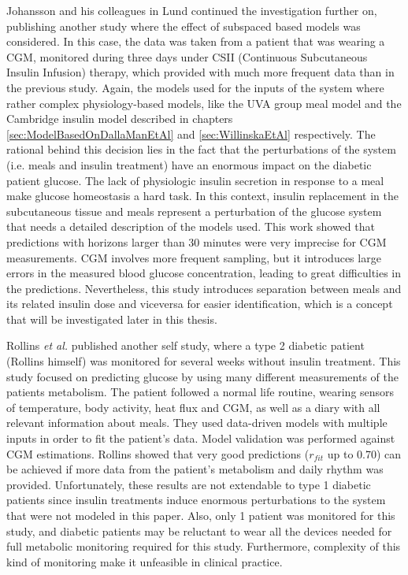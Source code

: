 Johansson and his colleagues in Lund continued the investigation further on, publishing another study \cite{cescon2009subspace} where the effect of subspaced based models was considered. In this case, the data was taken from a patient that was wearing a CGM, monitored during three days under CSII (Continuous Subcutaneous Insulin Infusion) therapy, which provided with much more frequent data than in the previous study. Again, the models used for the inputs of the system where rather complex physiology-based models, like the UVA group meal model and the Cambridge insulin model described in chapters \ref{sec:ModelBasedOnDallaManEtAl} and \ref{sec:WillinskaEtAl} respectively. The rational behind this decision lies in the fact that the perturbations of the system (i.e. meals and insulin treatment) have an enormous impact on the diabetic patient glucose. The lack of physiologic insulin secretion in response to a meal make glucose homeostasis a hard task. In this context, insulin replacement in the subcutaneous tissue and meals represent a perturbation of the glucose system that needs a detailed description of the models used. This work showed that predictions with horizons larger than 30 minutes were very imprecise for CGM measurements. CGM involves more frequent sampling, but it introduces large errors in the measured blood glucose concentration, leading to great difficulties in the predictions. Nevertheless, this study introduces separation between meals and its related insulin dose and viceversa for easier identification, which is a concept that will be investigated later in this thesis.

Rollins \textit{et al.} published another self study, where a type 2 diabetic patient (Rollins himself) was monitored for several weeks \cite{rollins2010free} without insulin treatment. This study focused on predicting glucose by using many different measurements of the patients metabolism. The patient followed a normal life routine, wearing sensors of temperature, body activity, heat flux and CGM, as well as a diary with all relevant information about meals. They used data-driven models with multiple inputs in order to fit the patient's data. Model validation was performed against CGM estimations.
Rollins showed that very good predictions ($r_{fit}$ up to 0.70) can be achieved if more data from the patient's metabolism and daily rhythm was provided. Unfortunately, these results are not extendable to type 1 diabetic patients since insulin treatments induce enormous perturbations to the system that were not modeled in this paper. Also, only 1 patient was monitored for this study, and diabetic patients may be reluctant to wear all the devices needed for full metabolic monitoring required for this study. Furthermore, complexity of this kind of monitoring make it unfeasible in clinical practice.

